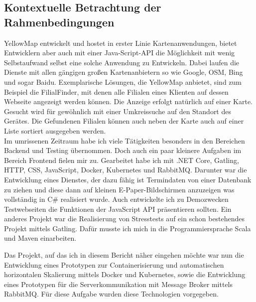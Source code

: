 \documentclass[12pt,a4paper]{article}
\begin{document}
\subsection{Kontextuelle Betrachtung der Rahmenbedingungen}

YellowMap entwickelt und hostet in erster Linie Kartenanwendungen, bietet Entwicklern aber auch mit einer Java-Script-API die Möglichkeit mit wenig Selbstaufwand selbst eine solche Anwendung zu Entwickeln. Dabei laufen die Dienste mit allen gängigen großen Kartenanbietern so wie Google, OSM, Bing und sogar Baidu. Exemplarische Lösungen, die YellowMap anbietet, sind zum Beispiel die FilialFinder, mit denen alle Filialen eines Klienten auf dessen Webseite angezeigt werden können. Die Anzeige erfolgt natürlich auf einer Karte. Gesucht wird für gewöhnlich mit einer Umkreissuche auf den Standort des Gerätes. Die Gefundenen Filialen können auch neben der Karte auch auf einer Liste sortiert ausgegeben werden.\\
Im umrissenen Zeitraum habe ich viele Tätigkeiten besonders in den Bereichen Backend und Testing übernommen. Doch auch ein paar kleinere Aufgaben im Bereich Frontend fielen mir zu. Gearbeitet habe ich mit .NET Core, Gatling, HTTP, CSS, JavaScript, Docker, Kubernetes und RabbitMQ. 
Darunter war die Entwicklung eines Dienstes, der dazu fähig ist Termindaten von einer Datenbank zu ziehen und diese dann auf kleinen E-Paper-Bildschirmen anzuzeigen was vollständig in C\# realisiert wurde. Auch entwickelte ich zu Demozwecken Testwebseiten die Funktionen der JavaScript API präsentieren sollten. Ein anderes Projekt war die Realisierung von Stresstests auf ein schon bestehendes Projekt mittels Gatling. Dafür musste ich mich in die Programmiersprache Scala und Maven einarbeiten. 

Das Projekt, auf das ich in diesem Bericht näher eingehen möchte war nun die Entwicklung eines Prototypen zur Containerisierung und automatischen horizontalen Skalierung mittels Docker und Kubernetes, sowie die Entwicklung eines Prototypen für die Serverkommunikation mit Message Broker mittels RabbitMQ. Für diese Aufgabe wurden diese Technologien vorgegeben. 
\end{document}
